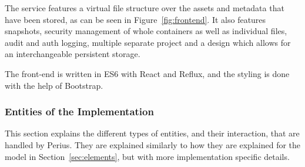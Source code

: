 \documentclass[a4paper,12pt]{article}
\begin{document}
The service features a virtual file structure over the assets and metadata that have been stored,
as can be seen in Figure~\ref{fig:frontend}. It also features snapshots, security management of
whole containers as well as individual files, audit and auth logging, multiple separate project 
and a design which allows for an interchangeable persistent storage.

The front-end is written in ES6 with React and Reflux, and the styling is done with the help of
Bootstrap.

\subsubsection{Entities of the Implementation}
This section explains the different types of entities, and their interaction, that are handled by
Perius. They are explained similarly to how they are explained for the model in
Section~\ref{sec:elements}, but with more implementation specific details.
\end{document}
